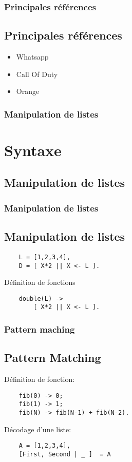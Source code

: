 \documentclass[notes=only]{beamer}
\begin{document}
\begin{frame}
  \frametitle{Principales références}
  \subsection[Références]{Principales références}

  \begin{itemize}
  \item Whatsapp
  \item Call Of Duty
  \item Orange
  \end{itemize}

\end{frame}

\begin{frame}
  \frametitle{Manipulation de listes}
  \section[Syntaxe]{Syntaxe}
  \subsection[Listes]{Manipulation de listes}

\end{frame}

\begin{frame}[fragile]
  \frametitle{Manipulation de listes}
  \subsection[Listes]{Manipulation de listes}
  \begin{verbatim}
    L = [1,2,3,4],
    D = [ X*2 || X <- L ].
  \end{verbatim}
\end{frame}

\begin{frame}[fragile]
  Définition de fonctions
  \begin{verbatim}
    double(L) ->
        [ X*2 || X <- L ].
  \end{verbatim}
\end{frame}

\begin{frame}[fragile]
  \frametitle{Pattern maching}
  \subsection[Pattern Matching]{Pattern Matching}
  Définition de fonction:
  \begin{verbatim}
    fib(0) -> 0;
    fib(1) -> 1;
    fib(N) -> fib(N-1) + fib(N-2).
  \end{verbatim}

  Décodage d'une liste:
  \begin{verbatim}
    A = [1,2,3,4],
    [First, Second | _ ]  = A
  \end{verbatim}

\end{frame}
\end{document}
